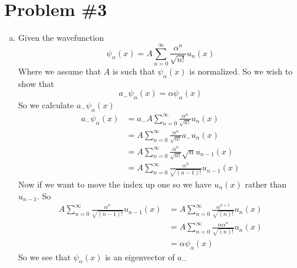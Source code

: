 \documentclass[11pt]{article}
\numberwithin{equation}{section}
\begin{document}
\section{Problem \#3}
\begin{enumerate}[(a)]
\item
Given the wavefunction 
$$\psi_{\alpha}(x) = A\sum_{n=0}^{\infty}\frac{\alpha^n}{\sqrt{n!}}u_n(x)$$
Where we assume that $A$ is such that $\psi_{\alpha}(x)$ is normalized. So we wish to show that
$$a_-\psi_{\alpha}(x) = \alpha\psi_{\alpha}(x)$$
So we calculate $a_-\psi_{\alpha}(x)$
\begin{align*}
a_-\psi_{\alpha}(x) &= a_-A\sum_{n=0}^{\infty}\frac{\alpha^n}{\sqrt{n!}}u_n(x)\\
&= A\sum_{n=0}^{\infty}\frac{\alpha^n}{\sqrt{n!}}a_-u_n(x)\\
&= A\sum_{n=0}^{\infty}\frac{\alpha^n}{\sqrt{n!}}\sqrt{n}u_{n-1}(x)\\
&= A\sum_{n=0}^{\infty}\frac{\alpha^n}{\sqrt{(n-1)!}}u_{n-1}(x)
\end{align*}
Now if we want to move the index up one so we have $u_n(x)$ rather than $u_{n-1}$. So
\begin{align*}
A\sum_{n=0}^{\infty}\frac{\alpha^n}{\sqrt{(n-1)!}}u_{n-1}(x) &= A\sum_{n=0}^{\infty}\frac{\alpha^{n+1}}{\sqrt{(n)!}}u_{n}(x)\\
&= A\sum_{n=0}^{\infty}\frac{\alpha\alpha^{n}}{\sqrt{(n)!}}u_{n}(x)\\
&= \alpha\psi_{\alpha}(x)
\end{align*}
So we see that $\psi_{\alpha}(x)$ is an eigenvector of $a_-$


\end{enumerate}
\end{document}
